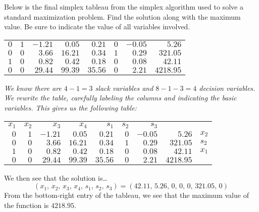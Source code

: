 \documentclass[12pt,letterpaper]{exam}
\begin{document}
\begin{questions}
\newpage
\question[10] Below is the final simplex tableau from the simplex algorithm used to solve a standard maximization problem. Find the solution along with the maximum value. Be sure to indicate the value of all variables involved. 
	\begin{table}[!ht]
	\centering
	\begin{tabular}{rrrrrrr|r}
	$0$ & $1$ & $-1.21$ & $0.05$ & $0.21$ & $0$ & $-0.05$ & $5.26$ \\
	$0$ & $0$ & $3.66$ & $16.21$ & $0.34$ & $1$ & $0.29$ & $321.05$ \\
	$1$ & $0$ & $0.82$ & $0.42$ & $0.18$ & $0$ & $0.08$ & $42.11$ \\ \hline
	$0$ & $0$ & $29.44$ & $99.39$ & $35.56$ & $0$ & $2.21$ & $4218.95$ \\
	\end{tabular}
	\end{table} \pspace

{\itshape We know there are $4 - 1= 3$ slack variables and $8 - 1 - 3= 4$ decision variables. We rewrite the table, carefully labeling the columns and indicating the basic variables. This gives us the following table:
	\begin{table}[!ht]
	\centering
	\begin{tabular}{rrrrrrrrl}
	\footnotesize$x_1$ & \footnotesize$x_2$ & \footnotesize$x_3$ & \footnotesize$x_4$ & \footnotesize$s_1$ & \footnotesize$s_2$ & \footnotesize$s_3$ \\
	$0$ & $1$ & $-1.21$ & $0.05$ & $0.21$ & $0$ & \multicolumn{1}{r|}{$-0.05$} & $5.26$ & \footnotesize$x_2$ \\
	$0$ & $0$ & $3.66$ & $16.21$ & $0.34$ & $1$ & \multicolumn{1}{r|}{$0.29$} & $321.05$ & \footnotesize$s_2$ \\
	$1$ & $0$ & $0.82$ & $0.42$ & $0.18$ & $0$ & \multicolumn{1}{r|}{$0.08$} & $42.11$ & \footnotesize$x_1$ \\ \cline{1-8}
	$0$ & $0$ & $29.44$ & $99.39$ & $35.56$ & $0$ & \multicolumn{1}{r|}{$2.21$} & $4218.95$ \\
	\end{tabular}
	\end{table} \par
We then see that the solution is\dots
	\[
	(x_1,\, x_2,\, x_3,\, x_4,\, s_1,\, s_2,\, s_3)= (42.11,\, 5.26,\, 0,\, 0,\, 0,\, 321.05,\, 0)
	\]
From the bottom-right entry of the tableau, we see that the maximum value of the function is $4218.95$. 
}




\end{questions}
\end{document}

